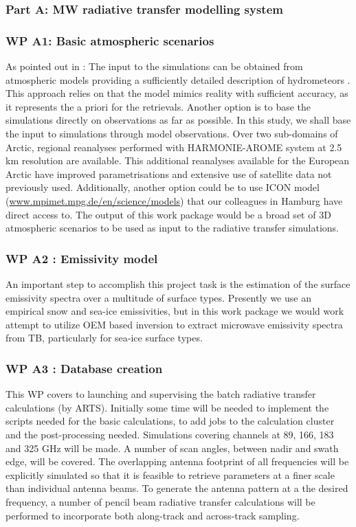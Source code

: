 \documentclass[12pt,oneside,a4paper]{article}
\begin{document}
\subsubsection{Part A: MW radiative transfer modelling system}

\subsubsection*{WP A1: Basic atmospheric scenarios}

As pointed out in \citet{eriksson:towar:20}: The input to the simulations can
be obtained from atmospheric models providing a sufficiently detailed
description of hydrometeors \citep[e.g.][]{wang2017statistical}. This approach
relies on that the model mimics reality with sufficient accuracy, as it
represents the a priori for the retrievals. Another option is to base the
simulations directly on observations as far as possible. In this study, we shall base the input to simulations through model observations. Over two sub-domains of Arctic, regional reanalyses performed with HARMONIE-AROME system at 2.5\,km resolution are available. This additional reanalyses available for the European Arctic have improved parametrisations and extensive use of satellite data not previously used. Additionally, another option could be to use ICON model
(\url{www.mpimet.mpg.de/en/science/models}) that our colleagues in Hamburg have direct access to. 
The output of this work package would be a broad set of 3D atmospheric scenarios to be used as input to the radiative transfer simulations.

\subsubsection*{WP A2 : Emissivity model}

An important step to accomplish this project task is the estimation of the surface emissivity spectra over a multitude of surface types. Presently we use an empirical snow and sea-ice emissivities, but in this work package we would work attempt to utilize OEM based inversion to extract microwave emissivity spectra from TB, particularly for sea-ice surface types. 

	
\subsubsection*{WP A3 : Database creation}
%	
This WP covers to launching and supervising the batch radiative transfer calculations (by ARTS).
Initially some time will be needed to implement the scripts needed for the basic calculations,
to add jobs to the calculation cluster and the post-processing needed. Simulations covering channels at 89, 166, 183 and 325 GHz will be made. A number of scan angles, between nadir and swath edge, will be covered. The overlapping antenna footprint of all frequencies will be explicitly simulated so that it is feasible to retrieve parameters at a finer scale than individual antenna beams. To generate the antenna pattern at a the desired frequency, a number of pencil beam radiative transfer calculations will be performed to incorporate both along-track and across-track sampling.
 
\end{document}
